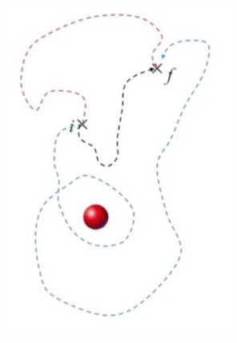 \documentclass[12pt,fleqn]{article}\usepackage{../../common}
\begin{document}
\includegraphics[width=20em]{09_03.jpg}
\end{document}
